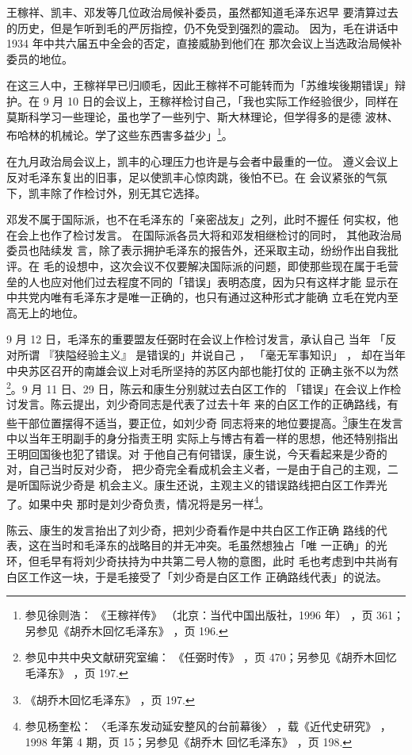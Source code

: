王稼祥、凯丰、邓发等几位政治局候补委员，虽然都知道毛泽东迟早
要清算过去的历史，但是乍听到毛的严厉指控，仍不免受到强烈的震动。
因为，毛在讲话中 1934 年中共六届五中全会的否定，直接威胁到他们在
那次会议上当选政治局候补委员的地位。

在这三人中，王稼祥早已归顺毛，因此王稼祥不可能转而为「苏维埃後期错误」辩护。在
9 月 10 日的会议上，王稼祥检讨自己，「我也实际工作经验很少，同样在
莫斯科学习一些理论，虽也学了一些列宁、斯大林理论，但学得多的是德
波林、布哈林的机械论。学了这些东西害多益少」\footnote{参见徐则浩：
《王稼祥传》
（北京：当代中国出版社，1996 年）
，页 361；另参见《胡乔木回忆毛泽东》
，页 196.}。

在九月政治局会议上，凯丰的心理压力也许是与会者中最重的一位。
遵义会议上反对毛泽东复出的旧事，足以使凯丰心惊肉跳，後怕不已。在
会议紧张的气氛下，凯丰除了作检讨外，别无其它选择。

邓发不属于国际派，也不在毛泽东的「亲密战友」之列，此时不握任
何实权，他在会上也作了检讨发言。
在国际派各员大将和邓发相继检讨的同时，
其他政治局委员也陆续发
言，除了表示拥护毛泽东的报告外，还采取主动，纷纷作出自我批评。在
毛的设想中，这次会议不仅要解决国际派的问题，即使那些现在属于毛营
垒的人也应对他们过去程度不同的「错误」表明态度，因为只有这样才能
显示在中共党内唯有毛泽东才是唯一正确的，也只有通过这种形式才能确
立毛在党内至高无上的地位。

9 月 12 日，毛泽东的重要盟友任弼时在会议上作检讨发言，承认自己
当年
「反对所谓
『狭隘经验主义』
是错误的」并说自己
，
「毫无军事知识」
，
却在当年中央苏区召开的南雄会议上对毛所坚持的苏区内部也能打仗的
正确主张不以为然\footnote{参见中共中央文献研究室编：
《任弼时传》
，页 470；另参见《胡乔木回忆毛泽东》
，页 197.}。9 月 11 日、29 日，陈云和康生分别就过去白区工作的
「错误」在会议上作检讨发言。陈云提出，刘少奇同志是代表了过去十年
来的白区工作的正确路线，有些干部位置摆得不适当，要正位，如刘少奇
同志将来的地位要提高。\footnote{《胡乔木回忆毛泽东》
，页 197.}康生在发言中以当年王明副手的身分指责王明
实际上与博古有着一样的思想，他还特别指出王明回国後也犯了错误。对
于他自己有何错误，康生说，今天看起来是少奇的对，自己当时反对少奇，
把少奇完全看成机会主义者，一是由于自己的主观，二是听国际说少奇是
机会主义。康生还说，主观主义的错误路线把白区工作弄光了。如果中央
那时是刘少奇负责，情况将是另一样\footnote{参见杨奎松：
〈毛泽东发动延安整风的台前幕後〉
，载《近代史研究》
，1998 年第 4 期，页 15；另参见《胡乔木
回忆毛泽东》
，页 198.}。

陈云、康生的发言抬出了刘少奇，把刘少奇看作是中共白区工作正确
路线的代表，这在当时和毛泽东的战略目的并无冲突。毛虽然想独占「唯
一正确」的光环，但毛早有将刘少奇扶持为中共第二号人物的意图，此时
毛也考虑到中共尚有白区工作这一块，于是毛接受了「刘少奇是白区工作
正确路线代表」的说法。

